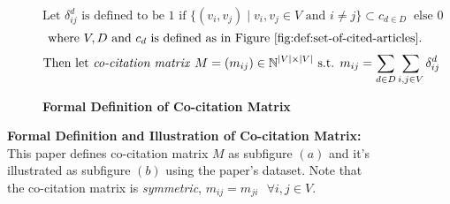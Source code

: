 \begin{figure}[ht]
    \begin{subfigure}[b]{1\textwidth}
        \[\text{Let } \delta^d_{ij} \text{ is defined to be } 1 \text{ if } \{(v_i, v_j) \mid v_i, v_j \in V \text{ and } i \neq j \} \subset c_{d \in D} \ \text{ else } 0\]
        \[\text{ where } V, D \text{ and } c_d \text{ is defined as in Figure \ref{fig:def:set-of-cited-articles}}. \]
        \[\text{Then let \textit{co-citation matrix} } M = (m_{ij}) \in \Bbb{N}^{|V| \times |V|} \text{ s.t. } m_{ij} = \sum_{d \in D}\sum_{i,j \in V}\delta^d_{ij}\]
        \caption{\textbf{Formal Definition of Co-citation Matrix}}
        \label{subfig:co-cites:def}
    \end{subfigure}
    \vfill
    \begin{subfigure}[b]{1\textwidth}
    \end{subfigure}
    \caption{\textbf{Formal Definition and Illustration of Co-citation Matrix:} This paper defines co-citation matrix $M$ as subfigure $(a)$ and it's illustrated as subfigure $(b)$ using the paper's dataset. Note that the co-citation matrix is \textit{symmetric}, $m_{ij} = m_{ji} \text{ } \forall i,j \in V$.}
    \label{fig:def-illus-co-cites}      
\end{figure}